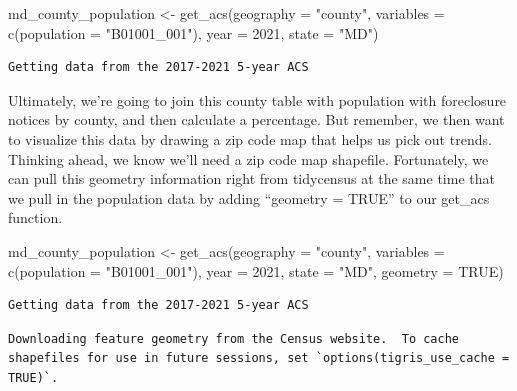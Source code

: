 \documentclass[
  letterpaper,
  DIV=11,
  numbers=noendperiod]{scrreprt}
\newenvironment{Shaded}{\begin{snugshade}}{\end{snugshade}}
\newcommand{\AttributeTok}[1]{\textcolor[rgb]{0.40,0.45,0.13}{#1}}
\newcommand{\ConstantTok}[1]{\textcolor[rgb]{0.56,0.35,0.01}{#1}}
\newcommand{\DecValTok}[1]{\textcolor[rgb]{0.68,0.00,0.00}{#1}}
\newcommand{\FunctionTok}[1]{\textcolor[rgb]{0.28,0.35,0.67}{#1}}
\newcommand{\NormalTok}[1]{\textcolor[rgb]{0.00,0.23,0.31}{#1}}
\newcommand{\OtherTok}[1]{\textcolor[rgb]{0.00,0.23,0.31}{#1}}
\newcommand{\StringTok}[1]{\textcolor[rgb]{0.13,0.47,0.30}{#1}}
\begin{document}
\begin{Shaded}
\begin{Highlighting}[]
\NormalTok{md\_county\_population }\OtherTok{\textless{}{-}} \FunctionTok{get\_acs}\NormalTok{(}\AttributeTok{geography =} \StringTok{"county"}\NormalTok{,}
              \AttributeTok{variables =} \FunctionTok{c}\NormalTok{(}\AttributeTok{population =} \StringTok{"B01001\_001"}\NormalTok{),}
              \AttributeTok{year =} \DecValTok{2021}\NormalTok{,}
              \AttributeTok{state =} \StringTok{"MD"}\NormalTok{)}
\end{Highlighting}
\end{Shaded}

\begin{verbatim}
Getting data from the 2017-2021 5-year ACS
\end{verbatim}

Ultimately, we're going to join this county table with population with
foreclosure notices by county, and then calculate a percentage. But
remember, we then want to visualize this data by drawing a zip code map
that helps us pick out trends. Thinking ahead, we know we'll need a zip
code map shapefile. Fortunately, we can pull this geometry information
right from tidycensus at the same time that we pull in the population
data by adding ``geometry = TRUE'' to our get\_acs function.

\begin{Shaded}
\begin{Highlighting}[]
\NormalTok{md\_county\_population }\OtherTok{\textless{}{-}} \FunctionTok{get\_acs}\NormalTok{(}\AttributeTok{geography =} \StringTok{"county"}\NormalTok{,}
              \AttributeTok{variables =} \FunctionTok{c}\NormalTok{(}\AttributeTok{population =} \StringTok{"B01001\_001"}\NormalTok{),}
              \AttributeTok{year =} \DecValTok{2021}\NormalTok{,}
              \AttributeTok{state =} \StringTok{"MD"}\NormalTok{,}
              \AttributeTok{geometry =} \ConstantTok{TRUE}\NormalTok{)}
\end{Highlighting}
\end{Shaded}

\begin{verbatim}
Getting data from the 2017-2021 5-year ACS
\end{verbatim}

\begin{verbatim}
Downloading feature geometry from the Census website.  To cache shapefiles for use in future sessions, set `options(tigris_use_cache = TRUE)`.
\end{verbatim}
\end{document}
